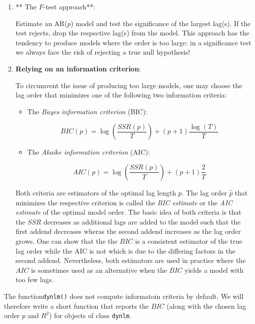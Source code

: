 \documentclass[]{book}
\theoremstyle{definition}
\theoremstyle{definition}
\theoremstyle{definition}
\theoremstyle{remark}
\begin{document}
\begin{enumerate}
\def\labelenumi{\arabic{enumi}.}
\item
  ** The \(F\)-test approach**:

  Estimate an AR(\(p\)) model and test the significance of the largest
  lag(s). If the test rejects, drop the respective lag(s) from the
  model. This approach has the tendency to produce models where the
  order is too large: in a significance test we always face the risk of
  rejecting a true null hypothesis!
\item
  \textbf{Relying on an information criterion}:

  To circumvent the issue of producing too large models, one may choose
  the lag order that minimizes one of the following two information
  criteria:

  \begin{itemize}
  \item
    The \emph{Bayes information criterion} (BIC):

    \[BIC(p) = \log\left(\frac{SSR(p)}{T}\right) + (p + 1) \frac{\log(T)}{T}\]
  \item
    The \emph{Akaike information criterion} (AIC):

    \[AIC(p) = \log\left(\frac{SSR(p)}{T}\right) + (p + 1) \frac{2}{T}\]
  \end{itemize}

  Both criteria are estimators of the optimal lag length \(p\). The lag
  order \(\widehat{p}\) that minimizes the respective criterion is
  called the \emph{BIC estimate} or the \emph{AIC estimate} of the
  optimal model order. The basic idea of both criteria is that the
  \(SSR\) decreases as additional lags are added to the model such that
  the first addend decreases wheras the second addend increases as the
  lag order grows. One can show that the the \(BIC\) is a consistent
  estimator of the true lag order while the AIC is not which is due to
  the differing factors in the second addend. Nevertheless, both
  estimators are used in practice where the \(AIC\) is sometimes used as
  an alternative when the \(BIC\) yields a model with too few lags.
\end{enumerate}

The function\texttt{dynlm()} does not compute informatoin criteria by
default. We will therefore write a short function that reports the
\(BIC\) (along with the chosen lag order \(p\) and \(R^2\)) for objects
of class \texttt{dynlm}.
\end{document}
